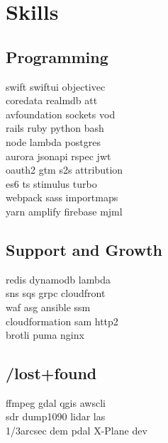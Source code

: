 \documentclass[]{plushcv}
\begin{document}
\begin{minipage}[t]{0.25\textwidth} 


\section{Skills}
\subsection{Programming}
\sectionsep
{}
swift \textbullet{} swiftui \textbullet{} objectivec  \\ 
coredata \textbullet{} realmdb \textbullet{} att \\
avfoundation \textbullet{} sockets \textbullet{} vod \\
\sectionsep
{}
rails \textbullet{} ruby \textbullet{} python \textbullet{} bash \\
node \textbullet{} lambda \textbullet{} postgres   \\
aurora \textbullet{} jsonapi \textbullet{} rspec \textbullet{} jwt \\
oauth2 \textbullet{} gtm \textbullet{} s2s attribution \\
\sectionsep
{}
es6 \textbullet{} ts \textbullet{} stimulus \textbullet{} turbo \\
webpack \textbullet{} sass \textbullet{} importmaps \\
yarn \textbullet{} amplify \textbullet{} firebase \textbullet{} mjml \\
\sectionsep
\sectionsep
\subsection{Support and Growth}
\sectionsep
redis \textbullet{} dynamodb \textbullet{} lambda \\
sns \textbullet{} sqs \textbullet{} grpc \textbullet{} cloudfront \\
waf \textbullet{} asg \textbullet{} ansible \textbullet{} ssm \\
cloudformation \textbullet{} sam \textbullet{} http2 \\
brotli \textbullet{} puma \textbullet{} nginx \\


\sectionsep
\sectionsep
\subsection{/lost+found}
\sectionsep
ffmpeg \textbullet{} gdal \textbullet{} qgis \textbullet{} awscli  \\
sdr \textbullet{} dump1090 \textbullet{} lidar las \\
1/3arcsec dem \textbullet{} pdal \textbullet{} X-Plane dev \\



\end{minipage}
\end{document}

